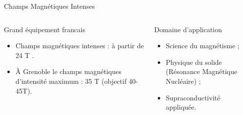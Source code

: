 \begin{frame}{Champs Magn\'etiques Intenses}
\begin{columns}[c]
 \begin{column}{5.9cm}
  \begin{alertblock}{ \begin{small} Grand équipement francais \end{small}}
    \begin{small}
   \begin{itemize}
    \item Champs magnétiques intenses : à partir de 24 T .
    \item À Grenoble le champs magnétiques d'intensité maximum : 35 T
      (objectif 40-45T).
   \end{itemize}
    \end{small}
  \end{alertblock}
 \end{column}
 \begin{column}{5.9cm}
  \begin{block}{ \begin{small} Domaine d'application \end{small}}
   \begin{small}
   \begin{itemize}
    \item Science du magnétisme ;
    \item Physique du solide  (Résonance Magnétique Nucléaire) ;
    \item Supraconductivité appliquée.
   \end{itemize}
    \end{small}
  \end{block}
 \end{column}
\end{columns}


\end{frame}
